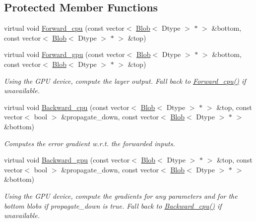 \subsection*{Protected Member Functions}
\begin{DoxyCompactItemize}
\item 
virtual void \hyperlink{classcaffe_1_1FilterLayer_a57b597be559867696898b34ff5fe6338}{Forward\+\_\+cpu} (const vector$<$ \hyperlink{classcaffe_1_1Blob}{Blob}$<$ Dtype $>$ $\ast$ $>$ \&bottom, const vector$<$ \hyperlink{classcaffe_1_1Blob}{Blob}$<$ Dtype $>$ $\ast$ $>$ \&top)
\item 
virtual void \hyperlink{classcaffe_1_1FilterLayer_ae9037245327193ba8d42f274b9fcfda8}{Forward\+\_\+gpu} (const vector$<$ \hyperlink{classcaffe_1_1Blob}{Blob}$<$ Dtype $>$ $\ast$ $>$ \&bottom, const vector$<$ \hyperlink{classcaffe_1_1Blob}{Blob}$<$ Dtype $>$ $\ast$ $>$ \&top)\hypertarget{classcaffe_1_1FilterLayer_ae9037245327193ba8d42f274b9fcfda8}{}\label{classcaffe_1_1FilterLayer_ae9037245327193ba8d42f274b9fcfda8}

\begin{DoxyCompactList}\small\item\em Using the G\+PU device, compute the layer output. Fall back to \hyperlink{classcaffe_1_1FilterLayer_a57b597be559867696898b34ff5fe6338}{Forward\+\_\+cpu()} if unavailable. \end{DoxyCompactList}\item 
virtual void \hyperlink{classcaffe_1_1FilterLayer_abaf7065db8ab50d5ef6a4acff85a0aeb}{Backward\+\_\+cpu} (const vector$<$ \hyperlink{classcaffe_1_1Blob}{Blob}$<$ Dtype $>$ $\ast$ $>$ \&top, const vector$<$ bool $>$ \&propagate\+\_\+down, const vector$<$ \hyperlink{classcaffe_1_1Blob}{Blob}$<$ Dtype $>$ $\ast$ $>$ \&bottom)
\begin{DoxyCompactList}\small\item\em Computes the error gradient w.\+r.\+t. the forwarded inputs. \end{DoxyCompactList}\item 
virtual void \hyperlink{classcaffe_1_1FilterLayer_a00f33332f047badddb94f04b7d892def}{Backward\+\_\+gpu} (const vector$<$ \hyperlink{classcaffe_1_1Blob}{Blob}$<$ Dtype $>$ $\ast$ $>$ \&top, const vector$<$ bool $>$ \&propagate\+\_\+down, const vector$<$ \hyperlink{classcaffe_1_1Blob}{Blob}$<$ Dtype $>$ $\ast$ $>$ \&bottom)\hypertarget{classcaffe_1_1FilterLayer_a00f33332f047badddb94f04b7d892def}{}\label{classcaffe_1_1FilterLayer_a00f33332f047badddb94f04b7d892def}

\begin{DoxyCompactList}\small\item\em Using the G\+PU device, compute the gradients for any parameters and for the bottom blobs if propagate\+\_\+down is true. Fall back to \hyperlink{classcaffe_1_1FilterLayer_abaf7065db8ab50d5ef6a4acff85a0aeb}{Backward\+\_\+cpu()} if unavailable. \end{DoxyCompactList}\end{DoxyCompactItemize}
